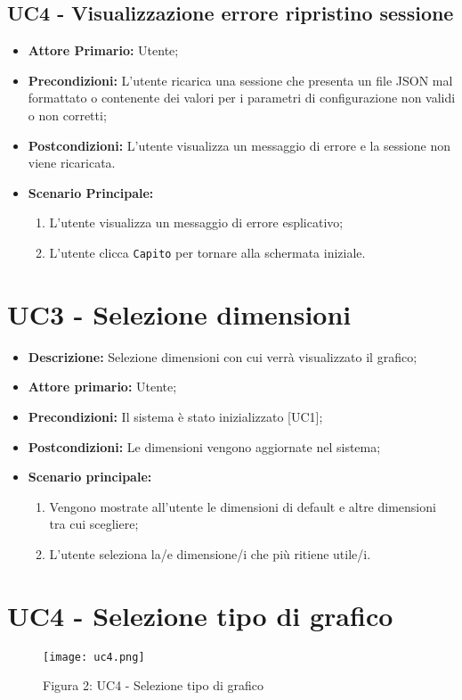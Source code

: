 \subsection{UC4 - Visualizzazione errore ripristino sessione}
\begin{itemize}
  \item \textbf{Attore Primario:} Utente;
  \item \textbf{Precondizioni:} L'utente ricarica una sessione che presenta un file JSON mal formattato o contenente dei valori per i parametri di configurazione non validi o non corretti;
  \item \textbf{Postcondizioni:} L'utente visualizza un messaggio di errore e la sessione non viene ricaricata.
  \item \textbf{Scenario Principale:}
  \begin{enumerate}
    \item L'utente visualizza un messaggio di errore esplicativo;
    \item L'utente clicca \texttt{Capito} per tornare alla schermata iniziale.
  \end{enumerate}
\end{itemize}


\section{UC3 - Selezione dimensioni}
 \begin{itemize}
     \item \textbf{Descrizione:} Selezione dimensioni con cui verrà visualizzato il grafico;
     \item \textbf{Attore primario:} Utente;
     \item \textbf{Precondizioni:} Il sistema è stato inizializzato [UC1];
     \item \textbf{Postcondizioni:} Le dimensioni vengono aggiornate nel sistema;
     \item \textbf{Scenario principale:}
     \begin{enumerate}
         \item Vengono mostrate all'utente le dimensioni di default e altre dimensioni tra cui scegliere;
         \item L'utente seleziona la/e dimensione/i che più ritiene utile/i.
     \end{enumerate}
 \end{itemize}


\section{UC4 - Selezione tipo di grafico}
\begin{figure}[H]
 \texttt{[image: uc4.png]}
 \vspace{-5mm}
 \caption*{Figura 2: UC4 - Selezione tipo di grafico}
\end{figure}

